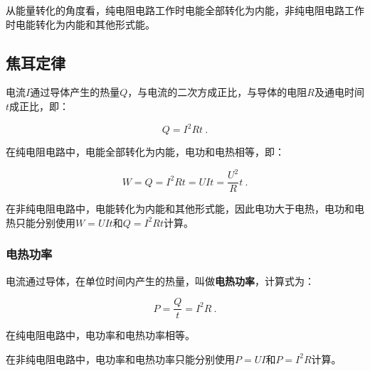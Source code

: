 从能量转化的角度看，纯电阻电路工作时电能全部转化为内能，非纯电阻电路工作时电能转化为内能和其他形式能。

\subsection{焦耳定律}

电流$I$通过导体产生的热量$Q$，与电流的二次方成正比，与导体的电阻$R$及通电时间$t$成正比，即：

\begin{equation}
Q=I^2Rt~.
\end{equation}

在纯电阻电路中，电能全部转化为内能，电功和电热相等，即：

\begin{equation}
W=Q=I^2Rt=UIt=\frac{U^2}{R}t~.
\end{equation}

在非纯电阻电路中，电能转化为内能和其他形式能，因此电功大于电热，电功和电热只能分别使用$W=UIt$和$Q=I^2Rt$计算。

\subsubsection{电热功率}

电流通过导体，在单位时间内产生的热量，叫做\textbf{电热功率}，计算式为：

\begin{equation}
P=\frac{Q}{t}=I^2R~.
\end{equation}

在纯电阻电路中，电功率和电热功率相等。

在非纯电阻电路中，电功率和电热功率只能分别使用$P=UI$和$P=I^2R$计算。
